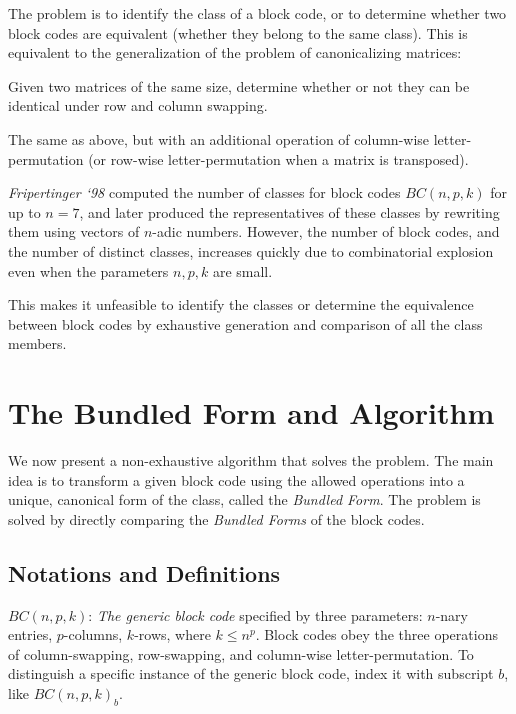 \documentclass[12pt]{article}  %
\begin{document}
The problem is to identify the class of a block code, or to determine whether two block codes are equivalent (whether they belong to the same class). This is equivalent to the generalization of the problem of canonicalizing matrices:

 Given two matrices of the same size, determine whether or not they can be identical under row and column swapping.

 The same as above, but with an additional operation of column-wise letter-permutation (or row-wise letter-permutation when a matrix is transposed).


\textit{Fripertinger `98} computed the number of classes for block codes $BC(n,p,k)$ for up to $n=7$, and later produced the representatives of these classes by rewriting them using vectors of $n$-adic numbers. However, the number of block codes, and the number of distinct classes, increases quickly due to combinatorial explosion even when the parameters $n,p,k$ are small. 

This makes it unfeasible to identify the classes or determine the equivalence between block codes by exhaustive generation and comparison of all the class members.













\section{The Bundled Form and Algorithm}
We now present a non-exhaustive algorithm that solves the problem. The main idea is to transform a given block code using the allowed operations into a unique, canonical form of the class, called the \textit{Bundled Form}. The problem is solved by directly comparing the \textit{Bundled Forms} of the block codes.














\subsection{Notations and Definitions}
$BC(n,p,k)$: \emph{The generic block code} specified by three parameters: $n$-nary entries, $p$-columns, $k$-rows, where $k \leq n^p$. Block codes obey the three operations of column-swapping, row-swapping, and column-wise letter-permutation. To distinguish a specific instance of the generic block code, index it with subscript $b$, like $BC(n,p,k)_b$.
\end{document}
